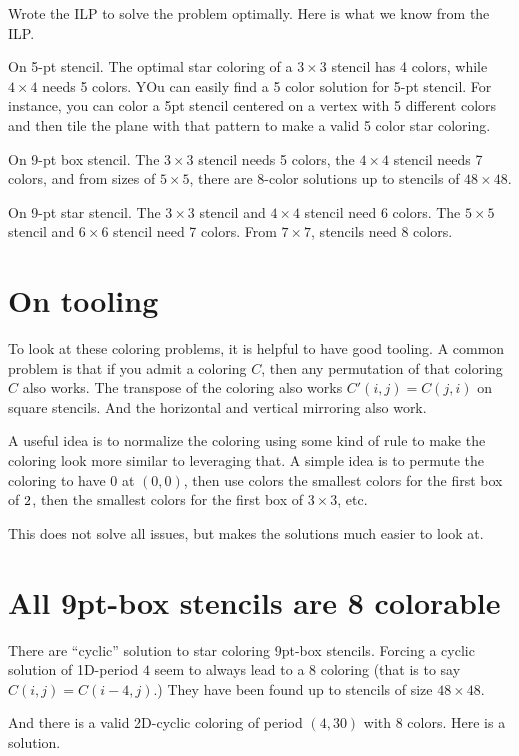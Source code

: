 \documentclass{article}
\begin{document}
Wrote the ILP to solve the problem optimally. Here is what we know
from the ILP.

On 5-pt stencil. The optimal star coloring of a $3 \times 3$ stencil
has 4 colors, while $4 \times 4$ needs 5 colors. YOu can easily find a
5 color solution for 5-pt stencil. For instance, you can color a 5pt stencil
centered on a vertex with 5 different colors and then tile the plane
with that pattern to make a valid 5 color star coloring.

On 9-pt box stencil. The $3 \times 3$ stencil needs 5 colors, the $4
\times 4$ stencil needs 7 colors, and from sizes of $5 \times 5$,
there are 8-color solutions up to stencils of $48 \times 48$.

On 9-pt star stencil. The $3 \times 3$ stencil and $4 \times 4$
stencil need 6 colors. The $5 \times 5$ stencil and $6 \times 6$
stencil need 7 colors. From $7 \times 7$, stencils need 8 colors.

\section{On tooling}

To look at these coloring problems, it is helpful to have good
tooling. A common problem is that if you admit a coloring $C$, then
any permutation of that coloring $C$ also works. The transpose of the
coloring also works $C'(i,j) = C(j,i)$ on square stencils. And the
horizontal and vertical mirroring also work.

A useful idea is to normalize the coloring using some kind of rule to
make the coloring look more similar to leveraging that. A simple idea
is to permute the coloring to have 0 at $(0,0)$, then use colors the
smallest colors for the first box of $2\time 2$, then the smallest
colors for the first box of $3 \times 3$, etc.

This does not solve all issues, but makes the solutions much easier to
look at.

\section{All 9pt-box stencils are 8 colorable}

There are ``cyclic'' solution to star coloring 9pt-box
stencils. Forcing a cyclic solution of 1D-period $4$ seem to always
lead to a 8 coloring (that is to say $C(i,j) = C(i-4,j)$.) They have
been found up to stencils of size $48 \times 48$.

And there is a valid 2D-cyclic coloring of period $(4,30)$ with 8
colors. Here is a solution.
\end{document}

